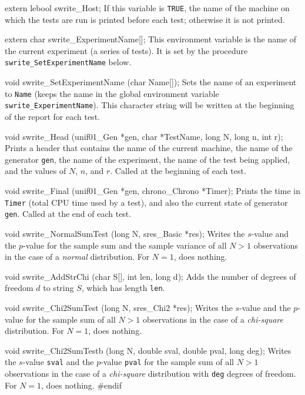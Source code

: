 extern lebool swrite_Host;
\endcode
 \tab If this variable is {\tt TRUE}, the name of the machine on which
the tests are run is printed before each test; otherwise it is not
printed.
 \endtab


\ifdetailed

\code

extern char swrite_ExperimentName[];
\endcode
 \tab This environment variable is the name of the current experiment
   (a series of tests). It is set by the procedure 
   {\tt swrite\_SetExperimentName} below.
 \endtab
\code


void swrite_SetExperimentName (char Name[]);
\endcode
 \tab Sets the name of an experiment to {\tt Name} (keeps the name in the
  global environment variable {\tt swrite\_ExperimentName}).
  This character string will be written at the beginning of the 
  report for each test.
\endtab
\code


void swrite_Head (unif01_Gen *gen, char *TestName, long N, long n, int r);
\endcode
 \tab
 Prints a header that contains the name of the current machine, 
 the name of the generator {\tt gen},
 the name of the experiment, the name of the test being applied, 
 and the values of $N$, $n$, and $r$.  Called at the beginning of each test.
\endtab
\code


void swrite_Final (unif01_Gen *gen, chrono_Chrono *Timer);
\endcode
\tab Prints the time in {\tt Timer} (total CPU time used by a test),
  and also the current state of generator {\tt gen}.
  Called at the end of each test.
\endtab
\code


void swrite_NormalSumTest (long N, sres_Basic *res);
\endcode
\tab  Writes the $s$-value and the $p$-value for the sample sum and the sample
  variance of all $N>1$ observations in the case of a {\em normal\/} distribution.
  For $N=1$, does nothing.
\endtab
\code


void swrite_AddStrChi (char S[], int len, long d);
\endcode
\tab Adds the number of degrees of freedom $d$ to string $S$,
  which has length {\tt len}.
\endtab
\code


void swrite_Chi2SumTest (long N, sres_Chi2 *res);
\endcode
\tab  Writes the $s$-value and the $p$-value for the sample sum
  of all $N>1$ observations in the case of a {\em chi-square\/} distribution.
  For $N=1$, does nothing.
\endtab
\code


void swrite_Chi2SumTestb (long N, double sval, double pval, long deg);
\endcode
\tab  Writes the $s$-value {\tt sval} and the $p$-value {\tt pval} for the 
  sample sum of all $N>1$ observations in the case of a {\em chi-square\/} 
  distribution with {\tt deg} degrees of freedom. For $N=1$, does nothing.
\endtab
\fi
\code\hide
#endif
\endhide\endcode
